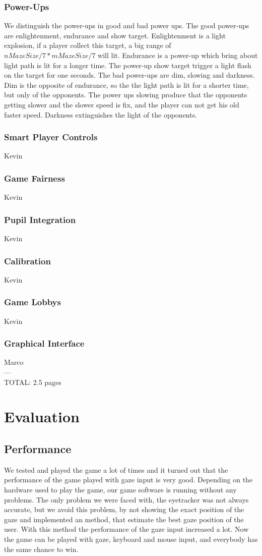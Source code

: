 \documentclass{sigchi}
\begin{document}
\subsubsection{Power-Ups} We distinguish the power-ups in good and bad power ups. The good power-ups are enlightenment, endurance and show target. Enlightenment is a light explosion, if a player collect this target, a big range of $nMazeSize/7 * mMazeSize/7$ will lit. Endurance is a power-up which bring about light path is lit for a longer time. The power-up show target trigger a light flash on the target for one seconds. The bad power-ups are dim, slowing and darkness. Dim is the opposite of endurance, so the the light path is lit for a shorter time, but only of the opponents. The power ups slowing produce that the opponents getting slower and the slower speed is fix, and the player can not get his old faster speed. Darkness extinguishes the light of the opponents. 
\subsubsection{Smart Player Controls} Kevin
\subsubsection{Game Fairness} Kevin
\subsubsection{Pupil Integration} Kevin
\subsubsection{Calibration} Kevin
\subsubsection{Game Lobbys} Kevin
\subsubsection{Graphical Interface} 

Marco\\
---\\
TOTAL: 2.5 pages


\section{Evaluation}
\subsection{Performance}
We tested and played the game a lot of times and it turned out that the performance of the game played with gaze input is very good. Depending on the hardware used to play the game, our game software is running without any problems. The only problem we were faced with, the eyetracker was not always accurate, but we avoid this problem, by not showing the exact position of the gaze and implemented an method, that estimate the best gaze position of the user. With this method the performance of the gaze input increased a lot. Now the game can be played with gaze, keyboard and mouse input, and everybody has the same chance to win.
\end{document}
